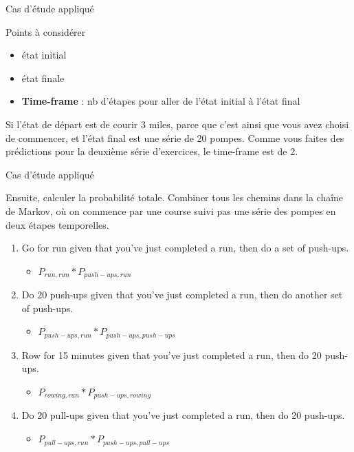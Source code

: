 \documentclass[aspectratio=169,xcolor=dvipsnames, t]{beamer}
\begin{document}
\begin{frame}{Cas d'étude appliqué}
	
	
	\begin{block}{Points à considérer}
		\begin{itemize}
			\item état initial
			\item état finale
			\item \textbf{Time-frame} : nb d'étapes pour aller de l'état initial à l'état final
		\end{itemize}
	\end{block}
	
	\begin{examples}
		Si l'état de départ est de courir 3 miles, parce que c'est ainsi que vous avez choisi de commencer, et l'état final est une série de 20 pompes. Comme vous faites des prédictions pour la deuxième série d'exercices, le time-frame est de 2.
	\end{examples}
	
\end{frame}

\begin{frame}{Cas d'étude appliqué}
	
	Ensuite, calculer la probabilité totale. 
	Combiner tous les chemins dans la chaîne de Markov, où on commence par une course suivi pas une série des pompes en deux étapes temporelles.
	\vspace{0.5cm}
	\begin{enumerate}
		\item Go for run given that you’ve just completed a run, then do a set of push-ups.
		\begin{itemize}
			\item $P_{run,run}*P_{push-ups,run}$
		\end{itemize}
		\item Do 20 push-ups given that you’ve just completed a run, then do another set of push-ups.
			\begin{itemize}
			\item $P_{push-ups,run}*P_{push-ups,push-ups}$
			\end{itemize}
		\item Row for 15 minutes given that you’ve just completed a run, then do 20 push-ups.
			\begin{itemize}
			\item $P_{rowing,run}*P_{push-ups,rowing}$
			\end{itemize}
		\item Do 20 pull-ups given that you’ve just completed a run, then do 20 push-ups.
			\begin{itemize}
			\item $P_{pull-ups,run}*P_{push-ups,pull-ups}$
			\end{itemize}
	\end{enumerate}
	
\end{frame}
\end{document}
